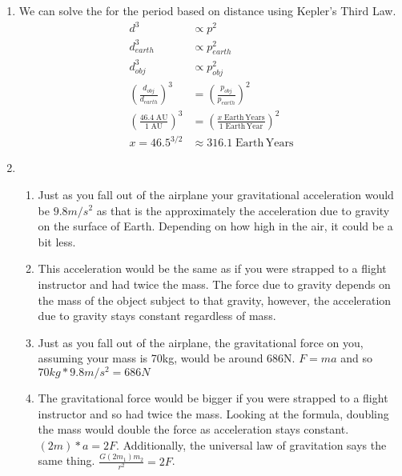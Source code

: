 \documentclass[../hw1.tex]{subfiles}
\begin{document}
    \begin{enumerate}
        \item We can solve the for the period based on distance using Kepler’s Third Law.
            \begin{align*}
            d^3 &\propto p^2\\
            d_{earth}^3 &\propto p_{earth}^2 \\
            d_{obj}^3 &\propto p_{obj}^2 \\
            \left(\frac{d_{obj}}{d_{earth}}\right)^3 &= \left(\frac{p_{obj}}{p_{earth}}\right)^2 \tag{then plug in values}\\
            \left(\frac{46.4\;\mathrm{AU}}{1\;\mathrm{AU}}\right)^3 &= \left(\frac{x\;\mathrm{Earth\,Years}}{1\;\mathrm{Earth\,Year}}\right)^2\\
            x = 46.5^{3/2} &\approx \boxed{316.1 \;\mathrm{Earth\,Years}}
        \end{align*}
        \item \begin{enumerate}
            \item Just as you fall out of the airplane your gravitational acceleration would be $9.8m/s^2$ as that is the approximately the acceleration due to gravity on the surface of Earth. Depending on how high in the air, it could be a bit less.
            \item This acceleration would be the same as if you were strapped to a flight instructor and had twice the mass. The force due to gravity depends on the mass of the object subject to that gravity, however, the acceleration due to gravity stays constant regardless of mass.
            \item Just as you fall out of the airplane, the gravitational force on you, assuming your mass is 70kg, would be around 686N. $F=ma$ and so $70kg*9.8m/s^2=\boxed{686N}$
            \item The gravitational force would be bigger if you were strapped to a flight instructor and so had twice the mass. Looking at the formula, doubling the mass would double the force as acceleration stays constant. $(2m)*a=2F$. Additionally, the universal law of gravitation says the same thing. $\frac{G(2m_1)m_2}{r^2}=2F$.
        \end{enumerate}
    \end{enumerate}
\end{document}
